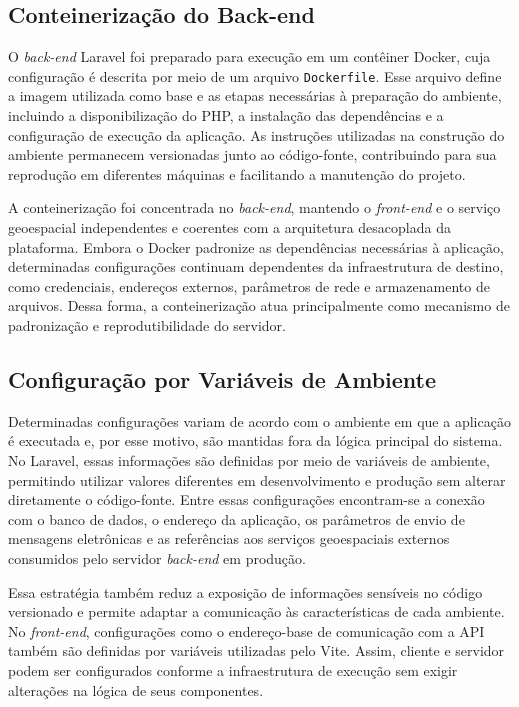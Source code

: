 \subsection{Conteinerização do Back-end}
\label{sec:conteinerizacao-backend}

O \textit{back-end} Laravel foi preparado para execução em um contêiner Docker, cuja configuração é descrita por meio de um arquivo \texttt{Dockerfile}. Esse arquivo define a imagem utilizada como base e as etapas necessárias à preparação do ambiente, incluindo a disponibilização do PHP, a instalação das dependências e a configuração de execução da aplicação. As instruções utilizadas na construção do ambiente permanecem versionadas junto ao código-fonte, contribuindo para sua reprodução em diferentes máquinas e facilitando a manutenção do projeto.

A conteinerização foi concentrada no \textit{back-end}, mantendo o \textit{front-end} e o serviço geoespacial independentes e coerentes com a arquitetura desacoplada da plataforma. Embora o Docker padronize as dependências necessárias à aplicação, determinadas configurações continuam dependentes da infraestrutura de destino, como credenciais, endereços externos, parâmetros de rede e armazenamento de arquivos. Dessa forma, a conteinerização atua principalmente como mecanismo de padronização e reprodutibilidade do servidor.

\subsection{Configuração por Variáveis de Ambiente}
\label{sec:variaveis-ambiente}

Determinadas configurações variam de acordo com o ambiente em que a aplicação é executada e, por esse motivo, são mantidas fora da lógica principal do sistema. No Laravel, essas informações são definidas por meio de variáveis de ambiente, permitindo utilizar valores diferentes em desenvolvimento e produção sem alterar diretamente o código-fonte. Entre essas configurações encontram-se a conexão com o banco de dados, o endereço da aplicação, os parâmetros de envio de mensagens eletrônicas e as referências aos serviços geoespaciais externos consumidos pelo servidor \textit{back-end} em produção.

Essa estratégia também reduz a exposição de informações sensíveis no código versionado e permite adaptar a comunicação às características de cada ambiente. No \textit{front-end}, configurações como o endereço-base de comunicação com a API também são definidas por variáveis utilizadas pelo Vite. Assim, cliente e servidor podem ser configurados conforme a infraestrutura de execução sem exigir alterações na lógica de seus componentes.

